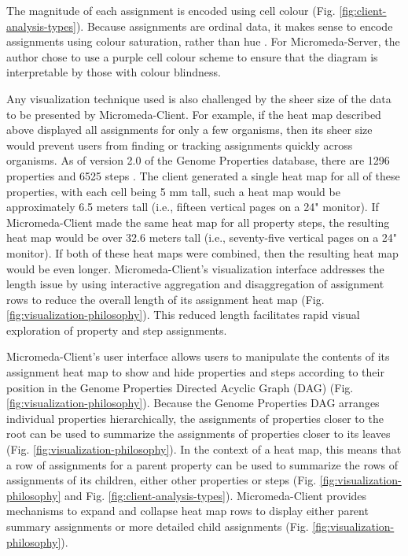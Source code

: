 The magnitude of each assignment is encoded using cell colour (Fig. \ref{fig:client-analysis-types}). Because assignments are ordinal data, it makes sense to encode assignments using colour saturation, rather than hue \cite{munzner2015visualization}. For Micromeda-Server, the author chose to use a purple cell colour scheme to ensure that the diagram is interpretable by those with colour blindness.

Any visualization technique used is also challenged by the sheer size of the data to be presented by Micromeda-Client. For example, if the heat map described above displayed all assignments for only a few organisms, then its sheer size would prevent users from finding or tracking assignments quickly across organisms. As of version 2.0 of the Genome Properties database, there are 1296 properties and 6525 steps \cite{richardson2018genome}. The client generated a single heat map for all of these properties, with each cell being 5 mm tall, such a heat map would be approximately 6.5 meters tall (i.e., fifteen vertical pages on a 24" monitor). If Micromeda-Client made the same heat map for all property steps, the resulting heat map would be over 32.6 meters tall (i.e., seventy-five vertical pages on a 24" monitor). If both of these heat maps were combined, then the resulting heat map would be even longer. Micromeda-Client's visualization interface addresses the length issue by using interactive aggregation and disaggregation \cite{munzner2015visualization} of assignment rows to reduce the overall length of its assignment heat map (Fig. \ref{fig:visualization-philosophy}). This reduced length facilitates rapid visual exploration of property and step assignments.

Micromeda-Client's user interface allows users to manipulate the contents of its assignment heat map to show and hide properties and steps according to their position in the Genome Properties Directed Acyclic Graph (DAG) \cite{richardson2018genome} (Fig. \ref{fig:visualization-philosophy}). Because the Genome Properties DAG arranges individual properties hierarchically, the assignments of properties closer to the root can be used to summarize the assignments of properties closer to its leaves (Fig. \ref{fig:visualization-philosophy}). In the context of a heat map, this means that a row of assignments for a parent property can be used to summarize the rows of assignments of its children, either other properties or steps (Fig. \ref{fig:visualization-philosophy} and Fig. \ref{fig:client-analysis-types}). Micromeda-Client provides mechanisms to expand and collapse heat map rows to display either parent summary assignments or more detailed child assignments (Fig. \ref{fig:visualization-philosophy}).

